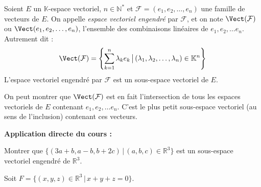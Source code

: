 \documentclass[french,11pt,twoside]{VcCours}
\newenvironment{ApplicationDirecte}{\textbf{Application directe du cours :}

}{}
\begin{document}
\begin{TheoremeDefinition}{}
Soient $E$ un $\mathbb{K}$-espace vectoriel, $n \in \mathbb{N}^*$ et $\mathcal{F}=(e_1, e_2, \ldots, e_n)$ une famille de vecteurs de $E$. On appelle \emph{espace vectoriel engendré} par $\mathcal{F}$, et on note $\Vect(\mathcal{F})$ ou $\Vect(e_1, e_2, \ldots, e_n)$, l'ensemble des combinaisons linéaires de $e_1, e_2, \ldots e_n$. Autrement dit :
$$ \Vect(\mathcal{F}) = \left\lbrace \sum_{k=1}^n \lambda_k e_k \, \big{\vert} \,  (\lambda_1, \lambda_2, \ldots, \lambda_n) \in \mathbb{K}^n \right\rbrace$$
L'espace vectoriel engendré par $\mathcal{F}$ est un sous-espace vectoriel de $E$.
\end{TheoremeDefinition}

\begin{Demonstration}{}
\vspace{6cm}
\end{Demonstration}

\begin{Remarque}{} On peut montrer que $\Vect(\mathcal{F})$ est en fait l'intersection de tous les espaces vectoriels de $E$ contenant $e_1, e_2, \ldots e_n$. C'est le plus petit sous-espace vectoriel (au sens de l'inclusion) contenant ces vecteurs.
\end{Remarque}

\medskip

\begin{ApplicationDirecte} Montrer que $\lbrace (3a+b,a-b,b+2c) \, \vert \, (a,b,c) \in \mathbb{R}^3 \rbrace$ est un sous-espace vectoriel engendré de $\mathbb{R}^3$.
\end{ApplicationDirecte}

\begin{Exemple} Soit $F = \lbrace (x,y,z) \in \mathbb{R}^3 \,  \vert \, x+y+z= 0 \rbrace.$ 

\vspace{3cm}

\end{Exemple}
\end{document}
